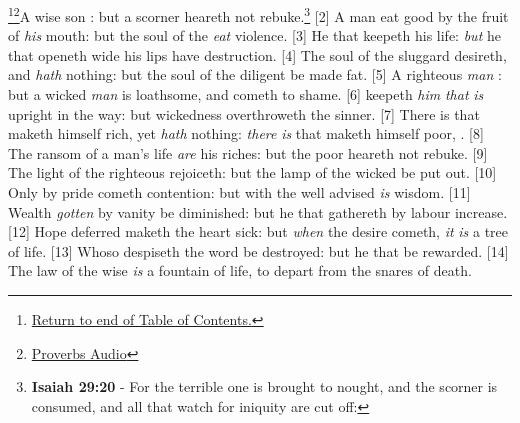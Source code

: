 \footnote{\textcolor[cmyk]{0.99998,1,0,0}{\hyperlink{TOC}{Return to end of Table of Contents.}}}\footnote{\href{https://www.audioverse.org/english/audiobibles/books/ENGKJV/O/Prov/1}{\textcolor[cmyk]{0.99998,1,0,0}{Proverbs Audio}}}\textcolor[cmyk]{0.99998,1,0,0}{A wise son : but a scorner heareth not rebuke.}\footnote{\textbf{Isaiah 29:20} - For the terrible one is brought to nought, and the scorner is consumed, and all that watch for iniquity are cut off:}
[2] \textcolor[cmyk]{0.99998,1,0,0}{A man  eat good by the fruit of \emph{his} mouth: but the soul of the  \emph{} \emph{eat} violence.}
[3] \textcolor[cmyk]{0.99998,1,0,0}{He that  keepeth his life: \emph{but} he that openeth wide his lips  have destruction.}
[4] \textcolor[cmyk]{0.99998,1,0,0}{The soul of the sluggard desireth, and \emph{hath} nothing: but the soul of the diligent  be made fat.}
[5] \textcolor[cmyk]{0.99998,1,0,0}{A righteous \emph{man} : but a wicked \emph{man} is loathsome, and cometh to shame.}
[6] \textcolor[cmyk]{0.99998,1,0,0}{ keepeth \emph{him} \emph{that} \emph{is} upright in the way: but wickedness overthroweth the sinner.}
[7] \textcolor[cmyk]{0.99998,1,0,0}{There is that maketh himself rich, yet \emph{hath} nothing: \emph{there} \emph{is} that maketh himself poor, .}
[8] \textcolor[cmyk]{0.99998,1,0,0}{The ransom of a man's life \emph{are} his riches: but the poor heareth not rebuke.}
[9] \textcolor[cmyk]{0.99998,1,0,0}{The light of the righteous rejoiceth: but the lamp of the wicked  be put out.}
[10] \textcolor[cmyk]{0.99998,1,0,0}{Only by pride cometh contention: but with the well advised \emph{is} wisdom.}
[11] \textcolor[cmyk]{0.99998,1,0,0}{Wealth \emph{gotten} by vanity  be diminished: but he that gathereth by labour  increase.}
[12] \textcolor[cmyk]{0.99998,1,0,0}{Hope deferred maketh the heart sick: but \emph{when} the desire cometh, \emph{it} \emph{is} a tree of life.}
[13] \textcolor[cmyk]{0.99998,1,0,0}{Whoso despiseth the word  be destroyed: but he that   be rewarded.}
[14] \textcolor[cmyk]{0.99998,1,0,0}{The law of the wise \emph{is} a fountain of life, to depart from the snares of death.}
